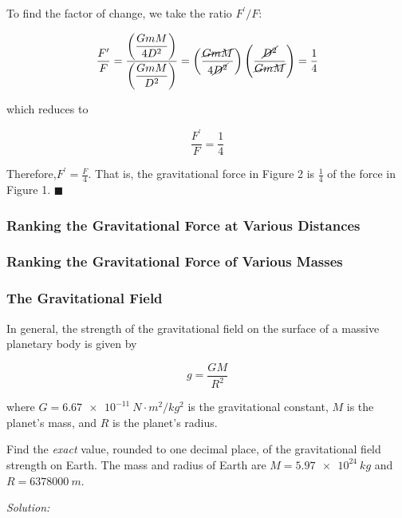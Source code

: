 \documentclass[dvipsnames]{article}
\begin{document}
To find the factor of change, we take the ratio $F^\prime/F$:

\begin{equation*}
    \frac{F^\prime}{F} = \frac{\left(\displaystyle \frac{GmM}{4D^2}\right)}{\left(\displaystyle \frac{GmM}{D^2}\right)} = \left(\frac{\cancel{GmM}}{4\cancel{D^2}}\right) \left(\frac{\cancel{D^2}}{\cancel{GmM}}\right) = \frac{1}{4}
\end{equation*}

which reduces to

\begin{equation*}
    \frac{F^\prime}{F} = \frac{1}{4}
\end{equation*}

Therefore,$F^\prime = \frac{F}{4}$. That is, the gravitational force in Figure 2 is $\frac{1}{4}$ of the force in Figure 1. \hfill $\blacksquare$

\subsubsection{Ranking the Gravitational Force at Various Distances}

\subsubsection{Ranking the Gravitational Force of Various Masses}

\subsubsection{The Gravitational Field}

In general, the strength of the gravitational field on the surface of a massive planetary body is given by

\begin{equation*}
    g = \frac{GM}{R^2}
\end{equation*}

where $G = \SI{6.67e-11}{N\cdot m^2/kg^2}$ is the gravitational constant, $M$ is the planet's mass, and $R$ is the planet's radius.

\begin{example}
    Find the \textit{exact} value, rounded to one decimal place, of the gravitational field strength on Earth. The mass and radius of Earth are $M = \SI{5.97e24}{kg}$ and $R = \SI[group-separator={,}]{6378000}{m}$. 
\end{example}

\textit{Solution:}
\end{document}
